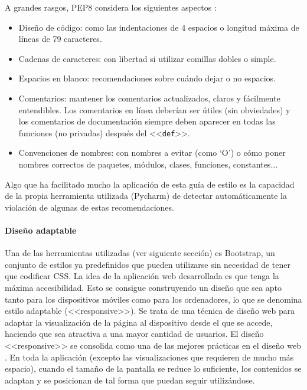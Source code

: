 A grandes rasgos, PEP8 considera los siguientes aspectos \cite{pep8}:

\begin{itemize}
	\item Diseño de código: como las indentaciones de 4 espacios o longitud
	máxima de líneas de 79 caracteres.
	\item Cadenas de caracteres: con libertad si utilizar comillas dobles o
	simple.
	\item Espacios en blanco: recomendaciones sobre cuándo dejar o no espacios.
	\item Comentarios: mantener los comentarios actualizados, claros y
	fácilmente entendibles. Los comentarios en línea deberían ser útiles (sin
	obviedades) y los comentarios de documentación siempre deben aparecer en
	todas las funciones (no privadas) después del <<\texttt{def}>>.
	\item Convenciones de nombres: con nombres a evitar (como `O') o cómo poner
	nombres correctos de paquetes, módulos, clases, funciones, constantes...
\end{itemize}

Algo que ha facilitado mucho la aplicación de esta guía de estilo es la
capacidad de la propia herramienta utilizada (Pycharm) de detectar
automáticamente la violación de algunas de estas recomendaciones.

\paragraph{Diseño adaptable} Una de las herramientas utilizadas (ver siguiente
sección) es Bootstrap, un conjunto de estilos ya predefinidos que pueden
utilizarse sin necesidad de tener que codificar CSS. La idea de la aplicación
web desarrollada es que tenga la máxima accesibilidad. Esto se consigue
construyendo un diseño que sea apto tanto para los dispositivos móviles como
para los ordenadores, lo que se denomina estilo adaptable (<<responsive>>). Se
trata de una técnica de diseño web para adaptar la visualización de la página al
dispositivo desde el que se accede, haciendo que sea atractiva a una mayor
cantidad de usuarios. El diseño <<responsive>> se consolida como una de las
mejores prácticas en el diseño web \cite{40defiebre}. En toda la aplicación
(excepto las visualizaciones que requieren de mucho más espacio), cuando el
tamaño de la pantalla se reduce lo suficiente, los contenidos se adaptan y se
posicionan de tal forma que puedan seguir utilizándose.

